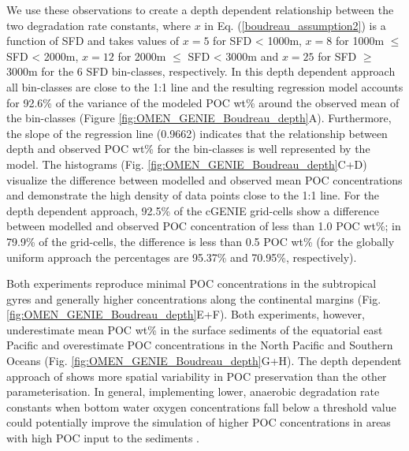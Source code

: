 \documentclass[gmd, manuscript]{copernicus}
\begin{document}
We use these observations to create a depth dependent relationship between the two degradation rate constants, where $x$ in Eq. (\ref{boudreau_assumption2}) is a function of SFD and takes values of $x=5$ for SFD < 1000m, $x=8$ for 1000m $\leq$ SFD < 2000m, 
$x=12$ for 2000m $\leq$ SFD < 3000m and $x=25$ for SFD $\geq$ 3000m for the 6 SFD bin-classes, respectively. 
In this depth dependent approach all bin-classes are close to the 1:1 line and the resulting regression model accounts for 92.6\% of the variance of the modeled POC wt\% around the observed mean of the bin-classes (Figure \ref{fig:OMEN_GENIE_Boudreau_depth}A). 
Furthermore, the slope of the regression line (0.9662) indicates that the relationship between depth and observed POC wt\% for the bin-classes is well represented by the model. 
The histograms (Fig. \ref{fig:OMEN_GENIE_Boudreau_depth}C+D) visualize the difference between modelled and observed mean POC concentrations and demonstrate the high density of data points close to the 1:1 line. 
For the depth dependent approach, 92.5\% of the cGENIE grid-cells show a difference between modelled and observed POC concentration of less than 1.0 POC wt\%; in 79.9\% of the grid-cells, the difference is less than 0.5 POC wt\% 
(for the globally uniform approach the percentages are 95.37\% and 70.95\%, respectively). 

Both experiments reproduce minimal POC concentrations in the subtropical gyres and generally higher concentrations along the continental margins (Fig. \ref{fig:OMEN_GENIE_Boudreau_depth}E+F). 
Both experiments, however, underestimate mean POC wt\% in the surface sediments of the equatorial east Pacific and overestimate POC concentrations 
in the North Pacific and Southern Oceans (Fig. \ref{fig:OMEN_GENIE_Boudreau_depth}G+H). 
The depth dependent approach of \citet{boudreau1997diagenetic} shows more spatial variability in POC preservation than the other parameterisation. 
In general, implementing lower, anaerobic degradation rate constants when bottom water oxygen concentrations fall below a threshold value could potentially improve the simulation of higher POC concentrations in areas with high POC input to the 
sediments \citep{palastanga_long_term_2011}. 


% 
\end{document}
